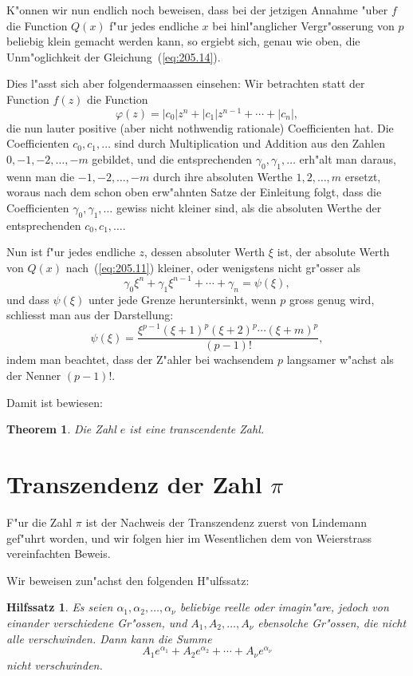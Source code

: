 \documentclass[10pt,a4paper]{article}
\theoremstyle{weberstyle}
\newtheorem{hilfssatz}{Hilfssatz}[section]
\newtheorem{theorem}{Theorem}[section]
\begin{document}
K"onnen wir nun endlich noch beweisen, dass bei der jetzigen Annahme
"uber $f$ die Function $Q(x)$ f"ur jedes endliche $x$ bei hinl"anglicher
Vergr"osserung von $p$ beliebig klein gemacht werden kann, so ergiebt sich,
genau wie oben, die Unm"oglichkeit der Gleichung~(\ref{eq:205.14}).

Dies l"asst sich aber folgendermaassen einsehen: Wir betrachten statt der
Function $f(z)$ die Function
\[
\varphi(z) = |c_0|z^n + |c_1|z^{n-1} + \cdots + |c_n|,
\]
die nun lauter positive (aber nicht nothwendig rationale) Coefficienten hat.
Die Coefficienten $c_0,c_1,\dots$ sind durch Multiplication und Addition
aus den Zahlen $0,-1,-2,\dots,-m$ gebildet, und die entsprechenden
$\gamma_0,\gamma_1,\dots$ erh"alt man daraus, wenn man die $-1,-2,\dots,-m$
durch ihre absoluten Werthe $1,2,\dots,m$ ersetzt, woraus nach dem schon
oben erw"ahnten Satze der Einleitung folgt, dass die Coefficienten
$\gamma_0,\gamma_1,\dots$ gewiss nicht kleiner sind, als die absoluten
Werthe der entsprechenden $c_0,c_1,\dots$.

Nun ist f"ur jedes endliche $z$, dessen absoluter Werth $\xi$ ist, der
absolute Werth von $Q(x)$ nach~(\ref{eq:205.11}) kleiner, oder wenigstens
nicht gr"osser als
\[
\gamma_0\xi^n + \gamma_1\xi^{n-1} + \cdots + \gamma_n = \psi(\xi),
\]
und dass $\psi(\xi)$ unter jede Grenze heruntersinkt, wenn $p$ gross genug
wird, schliesst man aus der Darstellung:
\[
\psi(\xi) = \frac{\xi^{p-1}(\xi+1)^p(\xi+2)^p\cdots(\xi+m)^p}{(p-1)!},
\]
indem man beachtet, dass der Z"ahler bei wachsendem $p$ langsamer w"achst
als der Nenner $(p-1)!$.

Damit ist bewiesen:
\begin{theorem}
Die Zahl $e$ ist eine \emph{transcendente Zahl}.
\end{theorem}

\newpage

%
%
\section{Transzendenz der Zahl $\pi$}\label{sec:206}

F"ur die Zahl $\pi$ ist der Nachweis der Transzendenz zuerst von
Lindemann gef"uhrt worden, und wir folgen hier im Wesentlichen dem von
Weierstrass vereinfachten Beweis.

Wir beweisen zun"achst den folgenden H"ulfssatz:
\begin{hilfssatz}
Es seien $\alpha_1,\alpha_2,\dots,\alpha_\nu$ beliebige reelle oder
imagin"are, jedoch von einander verschiedene Gr"ossen, und
$A_1,A_2,\dots,A_\nu$ ebensolche Gr"ossen, die nicht alle verschwinden.
Dann kann die Summe
\[
A_1e^{\alpha_1} + A_2e^{\alpha_2} + \cdots + A_\nu e^{\alpha_\nu}
\]
nicht verschwinden.
\end{hilfssatz}
\end{document}
